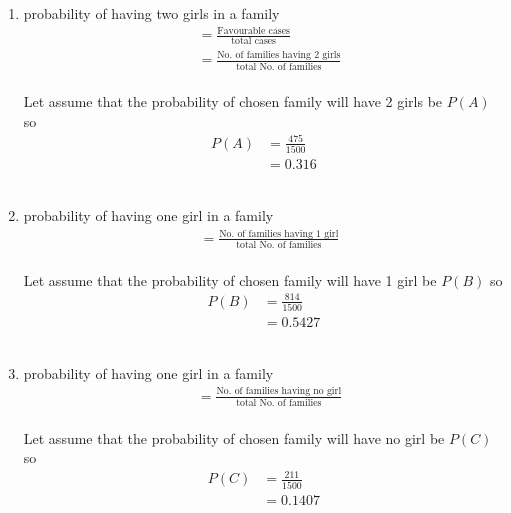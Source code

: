 \renewcommand{\theequation}{\theenumi}
\begin{enumerate}[label=\arabic*.,ref=\thesubsection.\theenumi]
\item probability of having two girls in a family
\begin{align}
&= \frac{\text {Favourable cases} }{\text {total cases}}
\\
&=\frac{\text {No. of families having 2 girls} }{\text {total No. of families}}
\end{align} 
\\
Let assume that the probability of chosen family will have 2 girls  be $P\left(A\right)$ so 
\begin{align}
P\left(A\right)&= \frac{475}{1500}
\\
&= 0.316
\end{align}
\\
\item probability of having one  girl in a family
\begin{align}
&=\frac{\text {No. of families having 1 girl} }{\text {total No. of families}}
\end{align} 
\\
Let assume that the probability of chosen family will have 1 girl  be $P\left(B\right)$ so 
\begin{align}
P\left(B\right)&= \frac{814}{1500}
\\
&= 0.5427
\end{align} 
\\
\item probability of having one  girl in a family
\begin{align}
&=\frac{\text {No. of families having no girl} }{\text {total No. of families}}
\end{align} 
\\
Let assume that the probability of chosen family will have no girl  be $P\left(C\right)$ so 
\begin{align}
P\left(C\right)&= \frac{211}{1500}
\\
&= 0.1407
\end{align} 


\end{enumerate}
